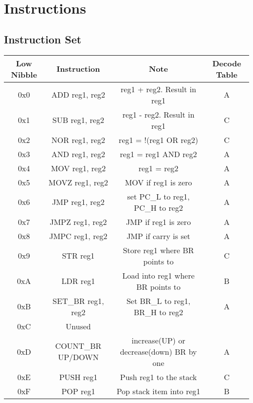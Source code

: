 \documentclass[a4paper, 12pt]{article}
\begin{document}
	\newpage
	\section{Instructions}
	\subsection{Instruction Set}
	\small\begin{center}
		\begin{tabular}{|c|c|c|c|}
			\hline
			Low Nibble & Instruction & Note & Decode Table\\ \hline
			0x0 & ADD reg1, reg2 & reg1 + reg2. Result in reg1 & A\\ \hline
			0x1 & SUB reg1, reg2 & reg1 - reg2. Result in reg1 & C \\ \hline
			0x2 & NOR reg1, reg2 & reg1 = !(reg1 OR reg2) & C \\ \hline
			0x3 & AND reg1, reg2 & reg1 = reg1 AND reg2 & A\\ \hline
			0x4 & MOV reg1, reg2 & reg1 = reg2 & A\\ \hline
			0x5 & MOVZ reg1, reg2 & MOV if reg1 is zero &  A\\ \hline
			0x6 & JMP reg1, reg2 & set PC\_L to reg1, PC\_H to reg2 & A\\ \hline
			0x7 & JMPZ reg1, reg2 & JMP if reg1 is zero & A\\ \hline
			0x8 & JMPC reg1, reg2 & JMP if carry is set & A\\ \hline
			0x9 & STR reg1 & Store reg1 where BR points to & C\\ \hline
			0xA & LDR reg1 & Load into reg1 where BR points to & B\\ \hline
			0xB & SET\_BR reg1, reg2 & Set BR\_L to reg1, BR\_H to reg2 & A\\ \hline
			0xC & Unused &  &  \\ \hline
			0xD & COUNT\_BR UP/DOWN & increase(UP) or decrease(down) BR by one & A\\ \hline
			0xE & PUSH reg1 & Push reg1 to the stack & C\\ \hline
			0xF & POP reg1 & Pop stack item into reg1 & B\\	\hline
		\end{tabular}
	\end{center}
	\newpage
\end{document}
